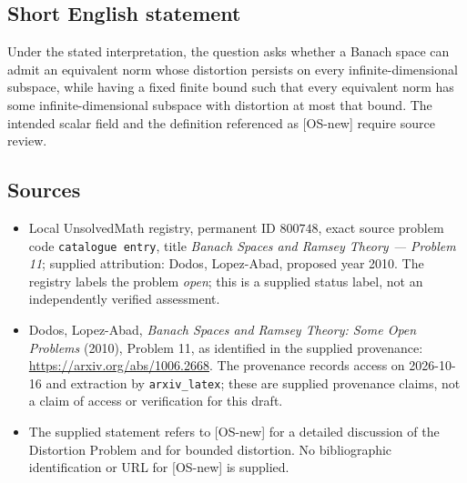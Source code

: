 \documentclass[11pt]{article}
\begin{document}
\subsection{Short English statement}
Under the stated interpretation, the question asks whether a Banach space can admit an equivalent norm whose distortion persists on every infinite-dimensional subspace, while having a fixed finite bound such that every equivalent norm has some infinite-dimensional subspace with distortion at most that bound. The intended scalar field and the definition referenced as [OS-new] require source review.
\subsection{Sources}
\begin{itemize}
\item Local UnsolvedMath registry, permanent ID \(800748\), exact source problem code \texttt{catalogue entry}, title \emph{Banach Spaces and Ramsey Theory --- Problem 11}; supplied attribution: Dodos, Lopez-Abad, proposed year 2010. The registry labels the problem \emph{open}; this is a supplied status label, not an independently verified assessment.
\item Dodos, Lopez-Abad, \emph{Banach Spaces and Ramsey Theory: Some Open Problems} (2010), Problem 11, as identified in the supplied provenance: \url{https://arxiv.org/abs/1006.2668}. The provenance records access on 2026-10-16 and extraction by \texttt{arxiv\_latex}; these are supplied provenance claims, not a claim of access or verification for this draft.
\item The supplied statement refers to [OS-new] for a detailed discussion of the Distortion Problem and for bounded distortion. No bibliographic identification or URL for [OS-new] is supplied.
\end{itemize}
\end{document}
